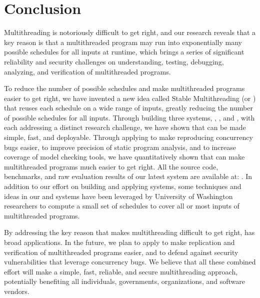 \chapter{Conclusion} \label{sec:conclusion}

Multithreading is notoriously difficult to get right, and our research reveals
that a key reason is that a multithreaded program may run into exponentially many
possible schedules for all inputs at runtime, which brings a series of
significant reliability and security challenges on understanding,
testing, debugging, analyzing, and verification of multithreaded
programs.

To reduce the number of possible schedules and make multithreaded
programs easier to get right, we have invented a new idea called Stable
Multithreading (or \smt) that reuses each schedule on a wide range of inputs,
greatly reducing the number of possible schedules for all inputs. Through
building three \smt systems, \tern, \peregrine, and \parrot, with each addressing
a distinct research challenge, we have shown that \smt can be made simple, fast,
and deployable. Through applying \smt to make reproducing concurrency bugs
easier, to improve precision of static program analysis, and to increase
coverage of model checking tools, we have quantitatively shown that \smt can
make multithreaded programs much easier to get right. All the source code,
benchmarks, and raw evaluation results of our latest \smt system \parrot are
available at: \github. In addition to our effort on building and applying \smt
systems, some techniques and ideas in our \tern and \peregrine systems have been
leveraged by University of Washington researchers to compute a small set of
schedules to cover all or most inputs of multithreaded programs.

By addressing the key reason that makes multithreading difficult to get right,
\smt has broad applications. In the future, we plan to apply \smt to make
replication and verification of multithreaded programs easier, and to defend
against security vulnerabilities that leverage concurrency bugs. We believe that
all these combined effort will make \smt a simple, fast, reliable, and secure
multithreading approach, potentially benefiting all individuals, governments,
organizations, and software vendors. 